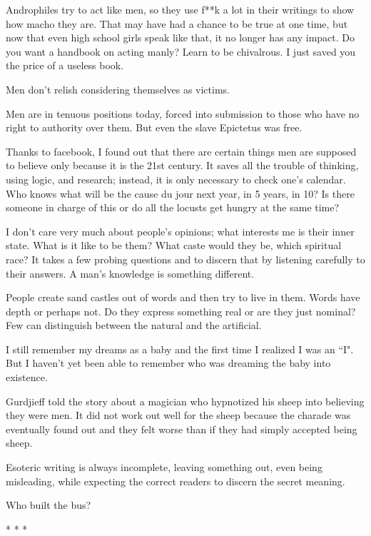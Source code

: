 Androphiles try to act like men, so they use f**k a lot in their writings to show how macho they are. That may have had a chance to be true at one time, but now that even high school girls speak like that, it no longer has any impact. Do you want a handbook on acting manly? Learn to be chivalrous. I just saved you the price of a useless book.

Men don't relish considering themselves as victims.

Men are in tenuous positions today, forced into submission to those who have no right to authority over them. But even the slave Epictetus was free.

Thanks to facebook, I found out that there are certain things men are supposed to believe only because it is the 21st century. It saves all the trouble of thinking, using logic, and research; instead, it is only necessary to check one's calendar. Who knows what will be the cause du jour next year, in 5 years, in 10? Is there someone in charge of this or do all the locusts get hungry at the same time?

I don't care very much about people's opinions; what interests me is their inner state. What is it like to be them? What caste would they be, which spiritual race? It takes a few probing questions and to discern that by listening carefully to their answers. A man's knowledge is something different.

People create sand castles out of words and then try to live in them. Words have depth or perhaps not. Do they express something real or are they just nominal? Few can distinguish between the natural and the artificial.

I still remember my dreams as a baby and the first time I realized I was an ``I". But I haven't yet been able to remember who was dreaming the baby into existence.

Gurdjieff told the story about a magician who hypnotized his sheep into believing they were men. It did not work out well for the sheep because the charade was eventually found out and they felt worse than if they had simply accepted being sheep.

Esoteric writing is always incomplete, leaving something out, even being misleading, while expecting the correct readers to discern the secret meaning.

Who built the bus?




\begin{center}* * *\end{center}

